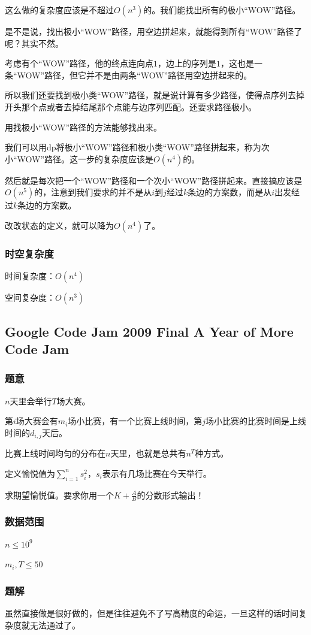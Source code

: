 \documentclass{ctexart}
\begin{document}
这么做的复杂度应该是不超过$O(n^3)$的。我们能找出所有的极小“WOW”路径。

是不是说，找出极小“WOW”路径，用空边拼起来，就能得到所有“WOW”路径了呢？其实不然。

考虑有个“WOW”路径，他的终点连向点$1$，边上的序列是$1$，这也是一条“WOW”路径，但它并不是由两条“WOW”路径用空边拼起来的。

所以我们还要找到极小类“WOW”路径，就是说计算有多少路径，使得点序列去掉开头那个点或者去掉结尾那个点能与边序列匹配。还要求路径极小。

用找极小“WOW”路径的方法能够找出来。

我们可以用dp将极小“WOW”路径和极小类“WOW”路径拼起来，称为次小“WOW”路径。这一步的复杂度应该是$O(n^4)$的。

然后就是每次把一个“WOW”路径和一个次小“WOW”路径拼起来。直接搞应该是$O(n^5)$的，注意到我们要求的并不是从$i$到$j$经过$k$条边的方案数，而是从$i$出发经过$k$条边的方案数。

改改状态的定义，就可以降为$O(n^4)$了。
\subsubsection{时空复杂度}
时间复杂度：$O(n^4)$

空间复杂度：$O(n^3)$
\subsection{Google Code Jam 2009 Final A Year of More Code Jam}
\subsubsection{题意}
$n$天里会举行$T$场大赛。

第$i$场大赛会有$m_i$场小比赛，有一个比赛上线时间，第$j$场小比赛的比赛时间是上线时间的$d_{i,j}$天后。

比赛上线时间均匀的分布在$n$天里，也就是总共有$n^T$种方式。

定义愉悦值为$\sum\limits_{i=1}^n s_i^2$，$s_i$表示有几场比赛在今天举行。

求期望愉悦值。要求你用一个$K+\frac{A}{B}$的分数形式输出！
\subsubsection{数据范围}
$n \le 10^9$

$m_i,T \le 50$
\subsubsection{题解}
虽然直接做是很好做的，但是往往避免不了写高精度的命运，一旦这样的话时间复杂度就无法通过了。
\end{document}
